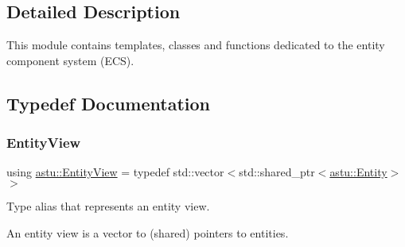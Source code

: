 \subsection{Detailed Description}
This module contains templates, classes and functions dedicated to the entity component system (E\+CS). 



\subsection{Typedef Documentation}
\mbox{\label{group__ecs__group_gace2fb790b86c3908a65e4222f7ac2f4e}} 
\subsubsection{\texorpdfstring{Entity\+View}{EntityView}}
{\footnotesize\ttfamily using \hyperlink{group__ecs__group_gace2fb790b86c3908a65e4222f7ac2f4e}{astu\+::\+Entity\+View} = typedef std\+::vector$<$std\+::shared\+\_\+ptr$<$\hyperlink{classastu_1_1Entity}{astu\+::\+Entity}$>$ $>$}

Type alias that represents an entity view.

An entity view is a vector to (shared) pointers to entities. 